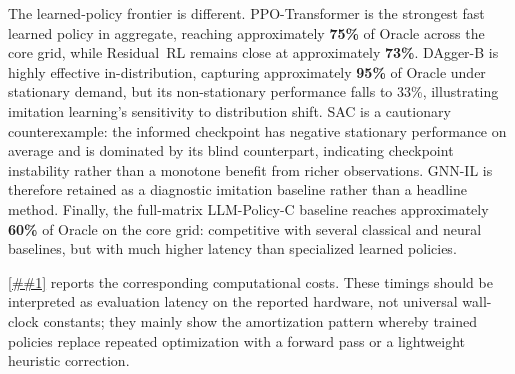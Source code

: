\documentclass[10pt,a4paper]{article}
\providecommand{\Cref}[1]{\ref{##1}}
\begin{document}
The learned-policy frontier is different. PPO-Transformer is the
strongest fast learned policy in aggregate, reaching approximately
\textbf{75\%} of Oracle across the core grid, while Residual~RL remains
close at approximately \textbf{73\%}. DAgger-B is highly effective
in-distribution, capturing approximately \textbf{95\%} of Oracle
under stationary demand, but its non-stationary performance falls to
33\%, illustrating imitation learning's sensitivity to distribution
shift. SAC is a cautionary counterexample: the informed checkpoint has
negative stationary performance on average and is dominated by its blind
counterpart, indicating checkpoint instability rather than a monotone
benefit from richer observations. GNN-IL is therefore retained as a
diagnostic imitation baseline rather than a headline method. Finally, the full-matrix LLM-Policy-C
baseline reaches approximately \textbf{60\%} of Oracle on the core grid:
competitive
with several classical and neural baselines, but with much higher
latency than specialized learned policies.

\Cref{tab:compute_quality} reports the corresponding computational
costs. These timings should be interpreted as evaluation latency on the
reported hardware, not universal wall-clock constants; they mainly show
the amortization pattern whereby trained policies replace repeated
optimization with a forward pass or a lightweight heuristic correction.
\end{document}
